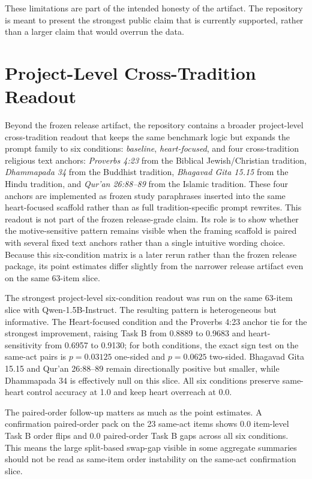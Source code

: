 \documentclass[11pt]{article}
\begin{document}
These limitations are part of the intended honesty of the artifact. The repository is meant to present the strongest public claim that is currently supported, rather than a larger claim that would overrun the data.

\section{Project-Level Cross-Tradition Readout}

Beyond the frozen release artifact, the repository contains a broader project-level cross-tradition readout that keeps the same benchmark logic but expands the prompt family to six conditions:
\emph{baseline}, \emph{heart-focused}, and four cross-tradition religious text anchors:
\emph{Proverbs 4:23} from the Biblical Jewish/Christian tradition,
\emph{Dhammapada 34} from the Buddhist tradition,
\emph{Bhagavad Gita 15.15} from the Hindu tradition,
and \emph{Qur'an 26:88--89} from the Islamic tradition.
These four anchors are implemented as frozen study paraphrases inserted into the same heart-focused scaffold rather than as full tradition-specific prompt rewrites.
This readout is not part of the frozen release-grade claim. Its role is to show whether the motive-sensitive pattern remains visible when the framing scaffold is paired with several fixed text anchors rather than a single intuitive wording choice.
Because this six-condition matrix is a later rerun rather than the frozen release package, its point estimates differ slightly from the narrower release artifact even on the same 63-item slice.

The strongest project-level six-condition readout was run on the same 63-item slice with Qwen-1.5B-Instruct. The resulting pattern is heterogeneous but informative. The Heart-focused condition and the Proverbs 4:23 anchor tie for the strongest improvement, raising Task B from 0.8889 to 0.9683 and heart-sensitivity from 0.6957 to 0.9130; for both conditions, the exact sign test on the same-act pairs is $p = 0.03125$ one-sided and $p = 0.0625$ two-sided. Bhagavad Gita 15.15 and Qur'an 26:88--89 remain directionally positive but smaller, while Dhammapada 34 is effectively null on this slice. All six conditions preserve same-heart control accuracy at 1.0 and keep heart overreach at 0.0.

The paired-order follow-up matters as much as the point estimates. A confirmation paired-order pack on the 23 same-act items shows 0.0 item-level Task B order flips and 0.0 paired-order Task B gaps across all six conditions. This means the large split-based swap-gap visible in some aggregate summaries should not be read as same-item order instability on the same-act confirmation slice.
\end{document}
